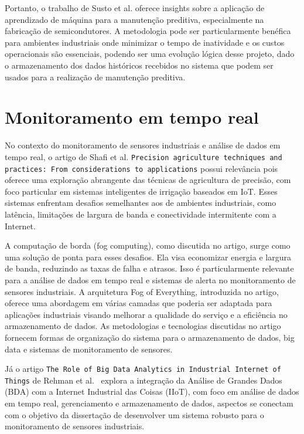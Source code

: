 Portanto, o trabalho de Susto et al. oferece insights sobre a aplicação de aprendizado de máquina para a manutenção preditiva, especialmente na fabricação de semicondutores. A metodologia pode ser particularmente benéfica para ambientes industriais onde minimizar o tempo de inatividade e os custos operacionais são essenciais, podendo ser uma evolução lógica desse projeto, dado o armazenamento dos dados históricos recebidos no sistema que podem ser usados para a realização de manutenção preditiva.


\section{Monitoramento em tempo real}

No contexto do monitoramento de sensores industriais e análise de dados em tempo real, o artigo de Shafi et al. \cite{shafi2019precision} \texttt{Precision agriculture techniques and practices: From considerations to applications} possui relevância pois oferece uma exploração abrangente das técnicas de agricultura de precisão, com foco particular em sistemas inteligentes de irrigação baseados em IoT. Esses sistemas enfrentam desafios semelhantes aos de ambientes industriais, como latência, limitações de largura de banda e conectividade intermitente com a Internet.

A computação de borda (fog computing), como discutida no artigo, surge como uma solução de ponta para esses desafios. Ela visa economizar energia e largura de banda, reduzindo as taxas de falha e atrasos. Isso é particularmente relevante para a análise de dados em tempo real e sistemas de alerta no monitoramento de sensores industriais. A arquitetura Fog of Everything, introduzida no artigo, oferece uma abordagem em várias camadas que poderia ser adaptada para aplicações industriais visando melhorar a qualidade do serviço e a eficiência no armazenamento de dados. As metodologias e tecnologias discutidas no artigo fornecem formas de organização do sistema para o armazenamento de dados, big data e sistemas de monitoramento de sensores.

Já o artigo \texttt{The Role of Big Data Analytics in Industrial Internet of Things} de Rehman et al.~\cite{REHMAN} explora a integração da Análise de Grandes Dados (BDA) com a Internet Industrial das Coisas (IIoT), com foco em análise de dados em tempo real, gerenciamento e armazenamento de dados, aspectos se conectam com o objetivo da dissertação de desenvolver um sistema robusto para o monitoramento de sensores industriais.

